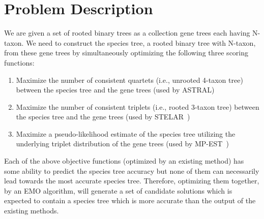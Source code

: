 \section{Problem Description}
\label{sec:problem}
We are given a set of rooted binary trees as a collection gene trees each having N-taxon. We need to construct the species tree, a rooted binary tree with N-taxon, from these gene trees by simultaneously optimizing the following three scoring functions:  
\begin{enumerate}
	\item Maximize the number of consistent quartets (i.e., unrooted 4-taxon tree) between the species tree and the gene trees (used by ASTRAL\cite{mirarab2014astral})
	\item Maximize the number of consistent triplets (i.e., rooted 3-taxon tree) between the species tree and the gene trees (used by STELAR~\cite{islam2019stelar})
	\item Maximize a pseudo-likelihood estimate of the species tree utilizing the underlying triplet distribution of the gene trees (used by MP-EST~\cite{liu2010maximum})
\end{enumerate}
Each of the above objective functions (optimized by an existing method) has some ability to predict the species tree accuracy but none of them can necessarily lead towards the most accurate species tree. Therefore, optimizing them together, by an EMO algorithm, will generate a set of candidate solutions which is expected to contain a species tree which is more accurate than the output of the existing methods.